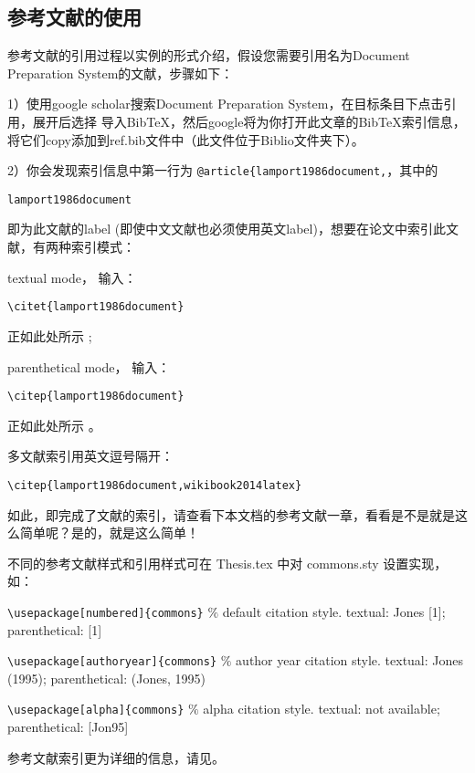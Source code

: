 \subsection{参考文献的使用}

参考文献的引用过程以实例的形式介绍，假设您需要引用名为Document Preparation System的文献，步骤如下：

1）使用google scholar搜索Document Preparation System，在目标条目下点击引用，展开后选择 导入BibTeX，然后google将为你打开此文章的BibTeX索引信息，将它们copy添加到ref.bib文件中（此文件位于Biblio文件夹下）。

2）你会发现索引信息中第一行为 \verb|@article{lamport1986document,|，其中的 
    
    \verb|lamport1986document| 
    
即为此文献的label (即使中文文献也必须使用英文label)，想要在论文中索引此文献，有两种索引模式：

textual mode， 输入：

\verb|\citet{lamport1986document}|

正如此处所示 \citet{lamport1986document}; 

parenthetical mode， 输入：

\verb|\citep{lamport1986document}|

正如此处所示 \citep{lamport1986document}。

多文献索引用英文逗号隔开：

\verb|\citep{lamport1986document,wikibook2014latex}|

如此，即完成了文献的索引，请查看下本文档的参考文献一章，看看是不是就是这么简单呢？是的，就是这么简单！

不同的参考文献样式和引用样式可在 Thesis.tex 中对 commons.sty 设置实现，如：

\verb+\usepackage[numbered]{commons}+ $\%$ default citation style. textual: Jones [1]; parenthetical: [1]

\verb+\usepackage[authoryear]{commons}+ $\%$ author year citation style. textual: Jones (1995); parenthetical: (Jones, 1995)

\verb+\usepackage[alpha]{commons}+ $\%$ alpha citation style. textual: not available; parenthetical: [Jon95]

参考文献索引更为详细的信息，请见\citep{wikibook2014latex}。

\nocite{*}%
